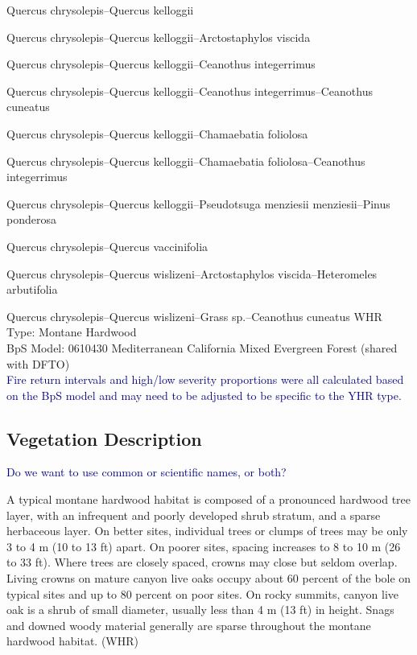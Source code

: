 \documentclass{article}
\newcommand{\mcomment}[1]{\textcolor{navy}{#1}}
\begin{document}
\par	Quercus chrysolepis--Quercus kelloggii
\par	Quercus chrysolepis--Quercus kelloggii--Arctostaphylos viscida
\par	Quercus chrysolepis--Quercus kelloggii--Ceanothus integerrimus
\par	Quercus chrysolepis--Quercus kelloggii--Ceanothus integerrimus--Ceanothus cuneatus
\par	Quercus chrysolepis--Quercus kelloggii--Chamaebatia foliolosa
\par	Quercus chrysolepis--Quercus kelloggii--Chamaebatia foliolosa--Ceanothus integerrimus
\par	Quercus chrysolepis--Quercus kelloggii--Pseudotsuga menziesii menziesii--Pinus ponderosa
\par	Quercus chrysolepis--Quercus vaccinifolia
\par	Quercus chrysolepis--Quercus wislizeni--Arctostaphylos viscida--Heteromeles arbutifolia
\par	Quercus chrysolepis--Quercus wislizeni--Grass sp.--Ceanothus cuneatus
WHR Type: Montane Hardwood\\
BpS Model: 0610430 Mediterranean California Mixed Evergreen Forest (shared with DFTO) \\
\mcomment{Fire return intervals and high/low severity proportions were all calculated based on the BpS model and may need to be adjusted to be specific to the YHR type.}


\subsection*{Vegetation Description}

\mcomment{Do we want to use common or scientific names, or both?}
\par A typical montane hardwood habitat is composed of a pronounced hardwood tree layer, with an infrequent and poorly developed shrub stratum, and a sparse herbaceous layer. On better sites, individual trees or clumps of trees may be only 3 to 4 m (10 to 13 ft) apart. On poorer sites, spacing increases to 8 to 10 m (26 to 33 ft). Where trees are closely spaced, crowns may close but seldom overlap. Living crowns on mature canyon live oaks occupy about 60 percent of the bole on typical sites and up to 80 percent on poor sites. %
On rocky summits, canyon live oak is a shrub of small diameter, usually less than 4 m (13 ft) in height. Snags and downed woody material generally are sparse throughout the montane hardwood habitat. (WHR)
\end{document}
